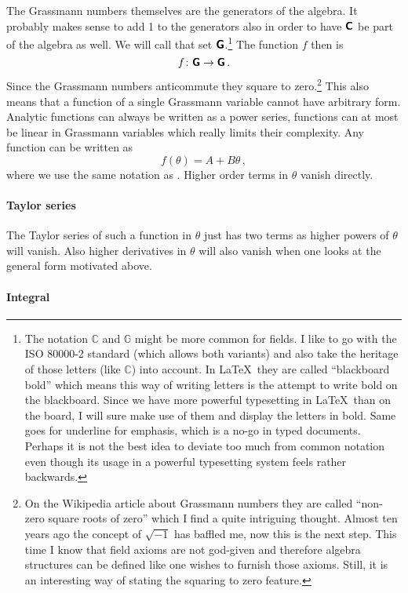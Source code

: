 \documentclass[11pt, english, fleqn, DIV=15, headinclude]{scrartcl}
\begin{document}
The Grassmann numbers themselves are the generators of the algebra. It probably
makes sense to add 1 to the generators also in order to have $\text{\bfseries\sffamily{C}}$  be part of
the algebra as well. We will call that set $\text{\bfseries\sffamily{G}}$.\footnote{%
    The notation $\mathbb C$ and $\mathbb G$ might be more common for fields. I like to go
    with the ISO 80000-2 standard (which allows both variants) and also take
    the heritage of those letters (like $\mathbb C$) into account. In \LaTeX\
    they are called “blackboard bold” which means this way of writing letters
    is the attempt to write bold on the blackboard. Since we have more powerful
    typesetting in \LaTeX\ than on the board, I will sure make use of them and
    display the letters in bold. Same goes for underline for emphasis, which is
    a no-go in typed documents. Perhaps it is not the best idea to deviate too
    much from common notation even though its usage in a powerful typesetting
    system feels rather backwards.
}
The function $f$ then is
\[
    f \colon \text{\bfseries\sffamily{G}} \to \text{\bfseries\sffamily{G}} \,.
\]
Since the Grassmann numbers anticommute they square to zero.\footnote{%
    On the Wikipedia article about Grassmann numbers they are called “non-zero
    square roots of zero” which I find a quite intriguing thought. Almost ten
    years ago the concept of $\sqrt{-1}$ has baffled me, now this is the next
    step. This time I know that field axioms are not god-given and therefore
    algebra structures can be defined like one wishes to furnish those axioms.
    Still, it is an interesting way of stating the squaring to zero feature.
}
This also means that a function of a single Grassmann variable cannot have
arbitrary form. Analytic functions can always be written as a power series,
functions can at most be linear in Grassmann variables which really limits
their complexity. Any function can be written as
\[
    f(\theta) = A + B \theta \,,
\]
where we use the same notation as \textcite[299]{Peskin/QFT/1995}. Higher order
terms in $\theta$ vanish directly.

\paragraph{Taylor series}

The Taylor series of such a function in $\theta$ just has two terms as higher
powers of $\theta$ will vanish. Also higher derivatives in $\theta$ will also
vanish when one looks at the general form motivated above.

\paragraph{Integral}
\end{document}
